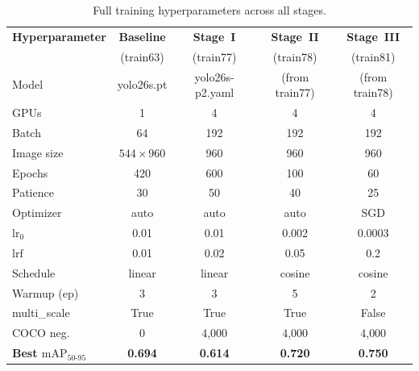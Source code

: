 \documentclass[11pt, a4paper]{article}
\newcommand{\mapfull}{\text{mAP}_{50\text{-}95}}
\begin{document}
\begin{table}[H]
  \centering
  \caption{Full training hyperparameters across all stages.}
  \label{tab:full_hyper}
  \small
  \begin{tabular}{@{}lcccc@{}}
    \toprule
    \textbf{Hyperparameter}  & \textbf{Baseline} & \textbf{Stage~I} & \textbf{Stage~II} & \textbf{Stage~III} \\
                             & (train63)         & (train77)        & (train78)         & (train81)          \\
    \midrule
    Model                    & yolo26s.pt        & yolo26s-p2.yaml  & (from train77)    & (from train78)     \\
    GPUs                     & 1                 & 4                & 4                 & 4                  \\
    Batch                    & 64                & 192              & 192               & 192                \\
    Image size               & $544{\times}960$  & 960              & 960               & 960                \\
    Epochs                   & 420               & 600              & 100               & 60                 \\
    Patience                 & 30                & 50               & 40                & 25                 \\
    Optimizer                & auto              & auto             & auto              & SGD                \\
    $\text{lr}_0$            & 0.01              & 0.01             & 0.002             & 0.0003             \\
    $\text{lrf}$             & 0.01              & 0.02             & 0.05              & 0.2                \\
    Schedule                 & linear            & linear           & cosine            & cosine             \\
    Warmup (ep)              & 3                 & 3                & 5                 & 2                  \\
    multi\_scale             & True              & True             & True              & False              \\
    COCO neg.                & 0                 & 4{,}000          & 4{,}000           & 4{,}000            \\
    \midrule
    \textbf{Best $\mapfull$} & \textbf{0.694}    & \textbf{0.614}   & \textbf{0.720}    & \textbf{0.750}     \\
    \bottomrule
  \end{tabular}
\end{table}
\end{document}
